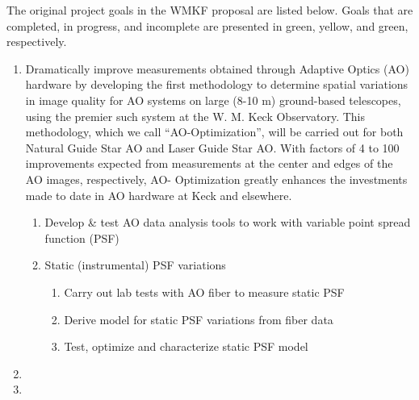 The original project goals in the WMKF proposal are listed below. Goals that are completed, in progress, and incomplete are presented in green, yellow, and green, respectively.

\begin{enumerate}
\item Dramatically improve measurements obtained through Adaptive Optics (AO) hardware by developing the first methodology to determine spatial variations in image quality for AO systems on large (8-10 m) ground-based telescopes, using the premier such system at the W. M. Keck Observatory. This methodology, which we call “AO-Optimization”, will be carried out for both Natural Guide Star AO and Laser Guide Star AO. With factors of 4 to 100 improvements expected from measurements at the center and edges of the AO images, respectively, AO- Optimization greatly enhances the investments made to date in AO hardware at Keck and elsewhere.
    \begin{enumerate}
    \item Develop & test AO data analysis tools to work with variable point spread function (PSF)
    \item Static (instrumental) PSF variations
        \begin{enumerate}
        \item Carry out lab tests with AO fiber to measure static PSF
        \item Derive model for static PSF variations from fiber data 
        \item Test, optimize and characterize static PSF model
        \end{enumerate}
    \end{enumerate}
\item
\item
\end{enumerate}
    